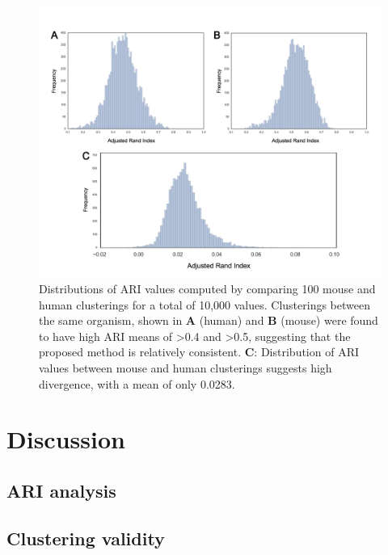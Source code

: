 \documentclass[12pt,oneside,onecolumn,a4paper]{article}
\begin{document}
\begin{figure}[H]
\begin{center}
\includegraphics[width=\columnwidth]{figures/ari_dist}
\caption{Distributions of ARI values computed by comparing 100 mouse and human clusterings for a total of 10,000 values. Clusterings between the same organism, shown in \textbf{A} (human) and \textbf{B} (mouse) were found to have high ARI means of \textgreater 0.4 and \textgreater 0.5, suggesting that the proposed method is relatively consistent. \textbf{C}: Distribution of ARI values between mouse and human clusterings suggests high divergence, with a mean of only 0.0283. \label{fig:ARI_table}%
}
\end{center}
\end{figure}

\section{Discussion}

\subsection{ARI analysis}

\subsection{Clustering validity}
\end{document}
